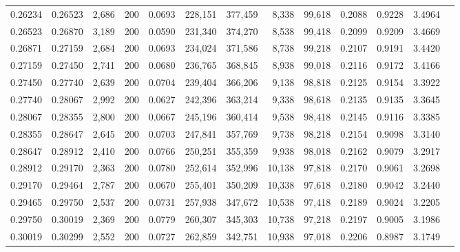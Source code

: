 \begin{tabular}{rrrrrrrrrrrrr}
0.26234 & 0.26523 &  2,686 & 200 &                                     0.0693 & 228,151 & 377,459 &   8,338 &  99,618 & 0.2088 & 0.9228 & 3.4964 \\
0.26523 & 0.26870 &  3,189 & 200 &                                     0.0590 & 231,340 & 374,270 &   8,538 &  99,418 & 0.2099 & 0.9209 & 3.4669 \\
0.26871 & 0.27159 &  2,684 & 200 &                                     0.0693 & 234,024 & 371,586 &   8,738 &  99,218 & 0.2107 & 0.9191 & 3.4420 \\
0.27159 & 0.27450 &  2,741 & 200 &                                     0.0680 & 236,765 & 368,845 &   8,938 &  99,018 & 0.2116 & 0.9172 & 3.4166 \\
0.27450 & 0.27740 &  2,639 & 200 &                                     0.0704 & 239,404 & 366,206 &   9,138 &  98,818 & 0.2125 & 0.9154 & 3.3922 \\
0.27740 & 0.28067 &  2,992 & 200 &                                     0.0627 & 242,396 & 363,214 &   9,338 &  98,618 & 0.2135 & 0.9135 & 3.3645 \\
0.28067 & 0.28355 &  2,800 & 200 &                                     0.0667 & 245,196 & 360,414 &   9,538 &  98,418 & 0.2145 & 0.9116 & 3.3385 \\
0.28355 & 0.28647 &  2,645 & 200 &                                     0.0703 & 247,841 & 357,769 &   9,738 &  98,218 & 0.2154 & 0.9098 & 3.3140 \\
0.28647 & 0.28912 &  2,410 & 200 &                                     0.0766 & 250,251 & 355,359 &   9,938 &  98,018 & 0.2162 & 0.9079 & 3.2917 \\
0.28912 & 0.29170 &  2,363 & 200 &                                     0.0780 & 252,614 & 352,996 &  10,138 &  97,818 & 0.2170 & 0.9061 & 3.2698 \\
0.29170 & 0.29464 &  2,787 & 200 &                                     0.0670 & 255,401 & 350,209 &  10,338 &  97,618 & 0.2180 & 0.9042 & 3.2440 \\
0.29465 & 0.29750 &  2,537 & 200 &                                     0.0731 & 257,938 & 347,672 &  10,538 &  97,418 & 0.2189 & 0.9024 & 3.2205 \\
0.29750 & 0.30019 &  2,369 & 200 &                                     0.0779 & 260,307 & 345,303 &  10,738 &  97,218 & 0.2197 & 0.9005 & 3.1986 \\
0.30019 & 0.30299 &  2,552 & 200 &                                     0.0727 & 262,859 & 342,751 &  10,938 &  97,018 & 0.2206 & 0.8987 & 3.1749 \\

\end{tabular}
